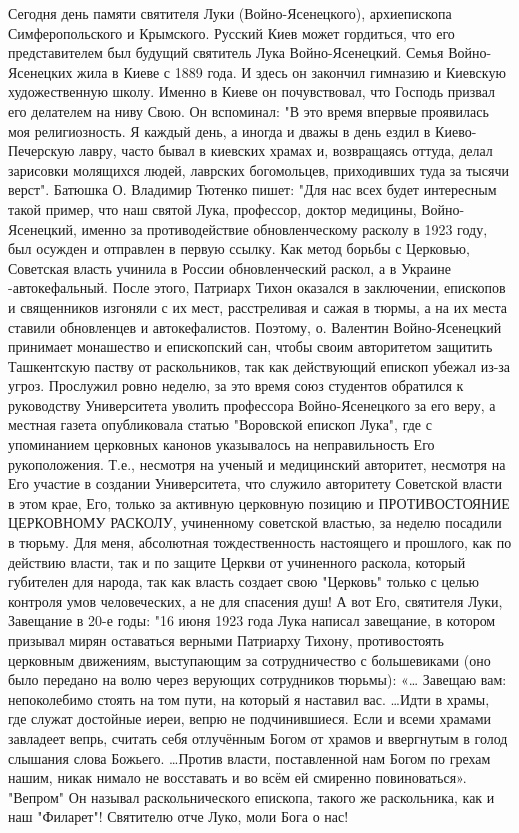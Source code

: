 Сегодня день памяти святителя Луки (Войно-Ясенецкого), архиепископа Симферопольского и Крымского.
Русский Киев может гордиться, что его представителем был будущий святитель Лука Войно-Ясенецкий.
Семья Войно-Ясенецких жила в Киеве с 1889 года. И здесь он закончил гимназию и Киевскую художественную школу.
Именно в Киеве он почувствовал, что Господь призвал его делателем на ниву Свою.
Он вспоминал: "В это время впервые проявилась моя религиозность. Я каждый день, а иногда и дважы в день ездил в Киево-Печерскую лавру, часто бывал в киевских храмах и, возвращаясь оттуда, делал зарисовки молящихся людей, лаврских богомольцев, приходивших туда за тысячи верст".
Батюшка О. Владимир Тютенко пишет:   "Для нас всех будет интересным такой пример, что наш святой Лука, профессор, доктор медицины, Войно-Ясенецкий, именно за противодействие обновленческому расколу в 1923 году, был осужден и отправлен в первую ссылку.
Как метод борьбы с Церковью, Советская власть учинила в России обновленческий раскол, а в Украине -автокефальный. После этого, Патриарх Тихон оказался в заключении, епископов и священников изгоняли с их мест, расстреливая и сажая в тюрмы, а на их места ставили обновленцев и автокефалистов. Поэтому, о. Валентин Войно-Ясенецкий принимает монашество и епископский сан, чтобы своим авторитетом защитить Ташкентскую паству от раскольников, так как действующий епископ убежал из-за угроз.
Прослужил ровно неделю, за это время союз студентов обратился к руководству Университета уволить профессора Войно-Ясенецкого за его веру, а местная газета опубликовала статью "Воровской епископ Лука", где с упоминанием церковных канонов указывалось на неправильность Его рукоположения. Т.е., несмотря на ученый и медицинский авторитет, несмотря на Его участие в создании Университета, что служило авторитету Советской власти в этом крае, Его, только за активную церковную позицию и ПРОТИВОСТОЯНИЕ ЦЕРКОВНОМУ РАСКОЛУ, учиненному советской властью, за неделю посадили в тюрьму.
Для меня, абсолютная тождественность настоящего и прошлого, как по действию власти, так и по защите Церкви от учиненного раскола, который губителен для народа, так как власть создает свою "Церковь" только с целью контроля умов человеческих, а не для спасения душ!
А вот Его, святителя Луки, Завещание в 20-е годы:
"16 июня 1923 года Лука написал завещание, в котором призывал мирян оставаться верными Патриарху Тихону, противостоять церковным движениям, выступающим за сотрудничество с большевиками (оно было передано на волю через верующих сотрудников тюрьмы):
«… Завещаю вам: непоколебимо стоять на том пути, на который я наставил вас. …Идти в храмы, где служат достойные иереи, вепрю не подчинившиеся. Если и всеми храмами завладеет вепрь, считать себя отлучённым Богом от храмов и ввергнутым в голод слышания слова Божьего.
…Против власти, поставленной нам Богом по грехам нашим, никак нимало не восставать и во всём ей смиренно повиноваться».
"Вепром" Он называл раскольнического епископа, такого же раскольника, как и наш "Филарет"!
Святителю отче Луко, моли Бога о нас!

